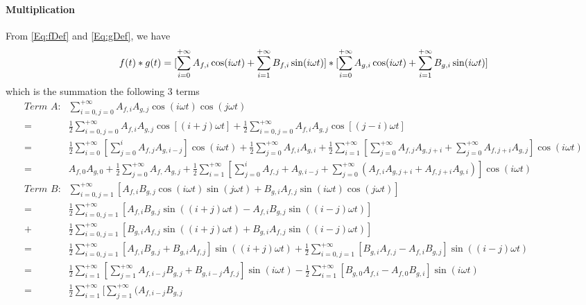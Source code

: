 \documentclass[12pt]{article}
\begin{document}
\paragraph{Multiplication}\label{App-Para:Multiplication}
From \autoref{Eq:fDef} and \autoref{Eq:gDef}, we have
\begin{equation}
	f(t)*g(t)=[\sum_{i=0}^{+\infty}A_{f, i}\cos(i\omega t)
	+\sum_{i=1}^{+\infty}B_{f, i}\sin(i\omega t)]
	*[\sum_{i=0}^{+\infty}A_{g, i}\cos(i\omega t)
	+\sum_{i=1}^{+\infty}B_{g, i}\sin(i\omega t)]\\
\end{equation}
which is the summation the following 3 terms
\begin{equation}
	\begin{aligned}
	\textit{Term A:} &\sum_{i=0, j=0}^{+\infty}A_{f,i}A_{g,j}
	\cos(i\omega t)\cos(j\omega t)\\
	=&\frac{1}{2}\sum_{i=0, j=0}^{+\infty}A_{f, i}A_{g, j}\cos[(i+j)\omega t] 
	+ \frac{1}{2}\sum_{i=0, j=0}^{+\infty}A_{f, i}A_{g, j}\cos[(j-i)\omega t]\\
	=&\frac{1}{2}\sum_{i=0}^{+\infty}[\sum_{j=0}^{i}A_{f,j}A_{g,i-j}]
	\cos(i\omega t)+\frac{1}{2}\sum_{j=0}^{+\infty}A_{f,i}A_{g,i}
	+\frac{1}{2}\sum_{i=1}^{+\infty}[\sum_{j=0}^{+\infty}A_{f, j}A_{g, j+i}
	+\sum_{j=0}^{+\infty}A_{f, j+i}A_{g, j}]\cos(i\omega t)\\
	=&A_{f,0}A_{g,0}+\frac{1}{2}\sum_{j=0}^{+\infty}A_{f,}A_{g,j}+\frac{1}{2}
	\sum_{i=1}^{+\infty}[\sum_{j=0}^{i}A_{f,j}+A_{g,i-j}+\sum_{j=0}^{+\infty}
	(A_{f,i}A_{g,j+i}+A_{f,j+i}A_{g,i})]\cos(i\omega t)\\
	\textit{Term B:} &\sum_{i=0,j=1}^{+\infty}[A_{f,i}B_{g,j}\cos(i\omega t)
	\sin(j\omega t)+B_{g,i}A_{f,j}\sin(i\omega t)\cos(j\omega t)]\\
	=&\frac{1}{2}\sum_{i=0,j=1}^{+\infty}[A_{f,i}B_{g,j}\sin((i+j)\omega t)
	-A_{f,i}B_{g,j}\sin((i-j)\omega t)]\\+&\frac{1}{2}
	\sum_{i=0,j=1}^{+\infty}[B_{g,i}A_{f,j}\sin((i+j)\omega t)+B_{g,i}A_{f,j}
	\sin((i-j)\omega t)]\\
	=&\frac{1}{2}\sum_{i=0,j=1}^{+\infty}[A_{f,i}B_{g,j}+B_{g,i}A_{f,j}]
	\sin((i+j)\omega t)+\frac{1}{2}\sum_{i=0,j=1}^{+\infty}
	[B_{g,i}A_{f,j}-A_{f,i}B_{g,j}]\sin((i-j)\omega t)\\
	=&\frac{1}{2}\sum_{i=1}^{+\infty}[\sum_{j=1}^{+\infty}
	A_{f,i-j}B_{g,j}+B_{g,i-j}A_{f,j}]\sin(i\omega t)
	-\frac{1}{2}\sum_{i=1}^{+\infty}[B_{g,0}A_{f,i}-A_{f,0}B_{g,i}]
	\sin(i\omega t)\\
	=&\frac{1}{2}\sum_{i=1}^{+\infty}[\sum_{j=1}^{+\infty}(A_{f,i-j}B_{g,j}

\end{aligned}
\end{equation}
\end{document}
